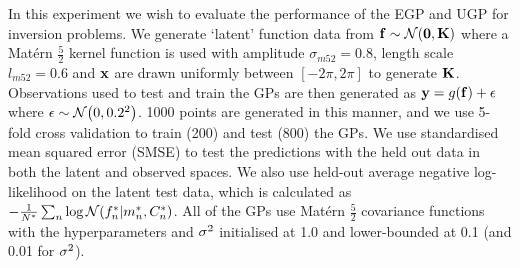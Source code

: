 \documentclass{article} %
\begin{document}
In this experiment we wish to evaluate the performance of the EGP and UGP for
inversion problems. We generate `latent' function data from $\mathbf{f} \sim
\mathcal{N}\!\left({\mathbf{0}, \mathbf{K}}\right)$ where a Mat\'ern $\frac{5}{2}$ kernel function is
used with amplitude $\sigma_{m52} = 0.8$, length scale $l_{m52} = 0.6$ and
$\mathbf{x}$ are drawn uniformly between $[-2\pi, 2\pi]$ to generate $\mathbf{K}$.
Observations used to test and train the GPs are then generated as $\mathbf{y} =
g\!\left({{\mathbf{f}}}\right) + \epsilon$ where $\epsilon \sim \mathcal{N}\!\left({0, 0.2^2}\right)$.  1000
points are generated in this manner, and we use 5-fold cross validation to
train (200) and test (800) the GPs.  We use standardised mean squared error
(SMSE) to test the predictions with the held out data in both the latent and
observed spaces. We also use held-out average negative log-likelihood on the
latent test data, which is calculated as $-\frac{1}{N^{*}} \sum_{n} \log
\mathcal{N}\!\left({f_n^{*}}\middle\vert{\ensuremath{m}_n\ensuremath{^{*}}, \ensuremath{C}_n\ensuremath{^{*}}}\right)$. All of the GPs use
Mat\'ern $\frac{5}{2}$ covariance functions with the hyperparameters and
$\sigma^2$ initialised at 1.0 and lower-bounded at 0.1 (and 0.01 for $\sigma^2$).
\end{document}
